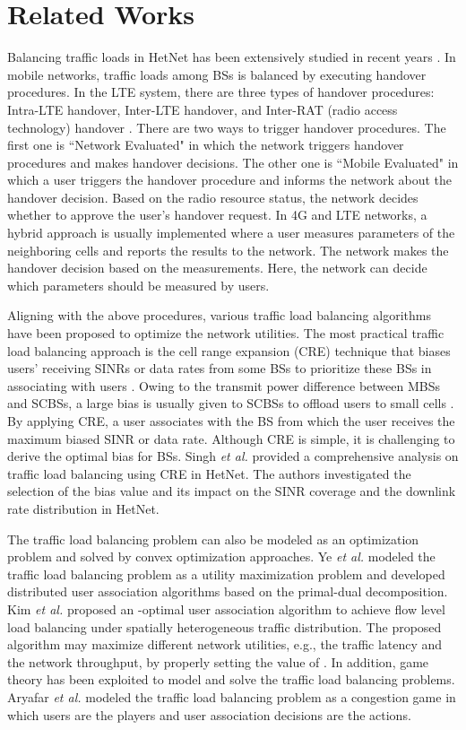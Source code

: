 \documentclass[journal]{IEEEtran}
\theoremstyle{definition}
\begin{document}
\section{Related Works}
\label{sec:related_work}
Balancing traffic loads in HetNet has been extensively studied in recent years \cite{Wang:2013:MMN}. In mobile networks, traffic loads among BSs is balanced by executing handover procedures. In the LTE system, there are three types of handover procedures: Intra-LTE handover, Inter-LTE handover, and Inter-RAT (radio access technology) handover \cite{LTE:2013:handover}. There are two ways to trigger handover procedures. The first one is ``Network Evaluated" in which the network triggers handover procedures and makes handover decisions. The other one is ``Mobile Evaluated" in which a user triggers the handover procedure and informs the network about the handover decision. Based on the radio resource status, the network decides whether to approve the user's handover request. In 4G and LTE networks, a hybrid approach is usually implemented where a user measures parameters of the neighboring cells and reports the results to the network. The network makes the handover decision based on the measurements. Here, the network can decide which parameters should be measured by users.

Aligning with the above procedures, various traffic load balancing algorithms have been proposed to optimize the network utilities. The most practical traffic load balancing approach is the cell range expansion (CRE) technique that biases users' receiving SINRs or data rates from some BSs to prioritize these BSs in associating with users \cite{Damn:2011:S3GPP}. Owing to the transmit power difference between MBSs and SCBSs, a large bias is usually given to SCBSs to offload users to small cells \cite{Andrews:2014:AOLB}. By applying CRE, a user associates with the BS from which the user receives the maximum biased SINR or data rate. Although CRE is simple, it is challenging to derive the optimal bias for BSs. Singh \emph{et al.} \cite{Singh:2013:OHN} provided a comprehensive analysis on traffic load balancing using CRE in HetNet. The authors investigated the selection of the bias value and its impact on the SINR coverage and the downlink rate distribution in HetNet.

The traffic load balancing problem can also be modeled as an optimization problem and solved by convex optimization approaches. Ye \emph{et al.} \cite{Ye:2013:UAL} modeled the traffic load balancing problem as a utility maximization problem and developed distributed user association algorithms based on the primal-dual decomposition. Kim \emph{et al.} \cite{Kim:2012:DOU} proposed an -optimal user association algorithm to achieve flow level load balancing under spatially heterogeneous traffic distribution. The proposed algorithm may maximize different network utilities, e.g., the traffic latency and the network throughput, by properly setting the value of . In addition, game theory has been exploited to model and solve the traffic load balancing problems. Aryafar \emph{et al.} \cite{Aryafar:2013:RSG} modeled the traffic load balancing problem as a congestion game in which users are the players and user association decisions are the actions.
\end{document}
